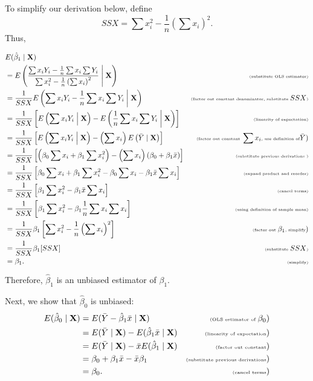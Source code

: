 \documentclass[
]{book}
\theoremstyle{definition}
\theoremstyle{definition}
\theoremstyle{definition}
\theoremstyle{definition}
\theoremstyle{remark}
\begin{document}
To simplify our derivation below, define
\[
SSX = \sum x_i^2-\frac{1}{n}\left(\sum  x_i\right)^2.
\]
Thus,

\[
\begin{aligned}
&E(\hat\beta_1 \mid \mathbf{X}) &\\
&= E\left(\frac{\sum x_iY_i -\frac{1}{n}\sum x_i\sum Y_i}{\sum x_i^2-\frac{1}{n}\left(\sum  x_i\right)^2} \Biggm| \mathbf{X} \right) &\tiny\text{(substitute OLS estimator)} \\
&= \frac{1}{SSX}E\left(\sum x_iY_i-\frac{1}{n}\sum x_i\sum Y_i \biggm| \mathbf{X}\right)&\tiny\text{(factor out constant denominator, substitute }SSX\text{)} \\
&= \frac{1}{SSX}\left[E\left(\sum x_iY_i\Bigm|\mathbf{X}\right)-E\left(\frac{1}{n}\sum x_i\sum Y_i\biggm|\mathbf{X}\right)\right]&\tiny\text{(linearity of expectation)}\\
&= \frac{1}{SSX}\left[E\left(\sum x_iY_i\Bigm|\mathbf{X}\right)-\left(\sum x_i\right)E\left(\bar Y\mid \mathbf{X}\right)\right]&\tiny\text{(factor out constant }\sum x_i\text{, use definition of}\bar{Y})\\
&= \frac{1}{SSX}\left[\left(\beta_0\sum x_i + \beta_1\sum x_i^2\right)-\left(\sum x_i\right)(\beta_0+\beta_1\bar x)\right]&\tiny\text{(substitute previous derivations
)}\\
&= \frac{1}{SSX}\left[\beta_0\sum x_i+\beta_1\sum x_i^2-\beta_0\sum x_i-\beta_1\bar x\sum x_i\right]&\tiny\text{(expand product and reorder)} \\
&= \frac{1}{SSX}\left[\beta_1\sum x_i^2-\beta_1\bar x\sum x_i\right]&\tiny\text{(cancel terms)}\\
&= \frac{1}{SSX}\left[\beta_1\sum x_i^2-\beta_1\frac{1}{n}\sum x_i\sum x_i\right]&\tiny\text{(using definition of sample mean)}\\
&= \frac{1}{SSX}\beta_1\left[\sum x_i^2-\frac{1}{n}\left(\sum x_i\right)^2\right]&\tiny\text{(factor out }\beta_1\text{, simplify})\\
&= \frac{1}{SSX}\beta_1[SSX]&\tiny\text{(substitute }SSX\text{)} \\
&=\beta_1. &\tiny\text{(simplify)}
\end{aligned}
\]

Therefore, \(\hat\beta_1\) is an unbiased estimator of \(\beta_1\).

Next, we show that \(\hat\beta_0\) is unbiased:
\[
\begin{aligned}
E(\hat\beta_0\mid \mathbf{X}) &= E(\bar Y - \hat{\beta}_1\bar x\mid \mathbf{X}) &\tiny\text{(OLS estimator of }\beta_0) \\
&= E(\bar{Y}\mid \mathbf{X}) - E(\hat\beta_1\bar{x}\mid \mathbf{X}) &\tiny\text{(linearity of expectation})\\
&= E(\bar{Y}\mid \mathbf{X}) - \bar{x}E(\hat\beta_1\mid \mathbf{X}) &\tiny\text{(factor out constant})\\
&= \beta_0 +\beta_1\bar x-\bar x\beta_1 &\tiny\text{(substitute previous derivations})\\
&= \beta_0. &\tiny\text{(cancel terms})\\
\end{aligned}
\]
\end{document}
